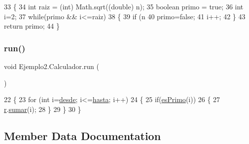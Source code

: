 \begin{DoxyCode}
33     \{
34         \textcolor{keywordtype}{int} raiz = (int) Math.sqrt((\textcolor{keywordtype}{double}) n);
35         \textcolor{keywordtype}{boolean} primo = \textcolor{keyword}{true};
36         \textcolor{keywordtype}{int} i=2;
37         \textcolor{keywordflow}{while}(primo && i<=raiz)
38         \{
39             \textcolor{keywordflow}{if} (n %
40                 primo=\textcolor{keyword}{false};
41             i++;
42         \}
43         \textcolor{keywordflow}{return} primo;
44     \}
\end{DoxyCode}
\mbox{\label{class_ejemplo2_1_1_calculador_a0b410188aefa5c53ddd250952ff2b8a9}} 
\subsubsection{\texorpdfstring{run()}{run()}}
{\footnotesize\ttfamily void Ejemplo2.\+Calculador.\+run (\begin{DoxyParamCaption}{ }\end{DoxyParamCaption})\hspace{0.3cm}{\ttfamily [inline]}}


\begin{DoxyCode}
22     \{
23         \textcolor{keywordflow}{for} (\textcolor{keywordtype}{int} i=\mbox{\hyperlink{class_ejemplo2_1_1_calculador_ae17892240dfa6e7eef00191f27759d95}{desde}}; i<=\mbox{\hyperlink{class_ejemplo2_1_1_calculador_a8d89146305d07fda007f0cb69038c62c}{hasta}}; i++)
24         \{
25             \textcolor{keywordflow}{if}(\mbox{\hyperlink{class_ejemplo2_1_1_calculador_aeef834dafd4eaa5ddebabe9b2db9b628}{esPrimo}}(i))
26             \{
27                 \mbox{\hyperlink{class_ejemplo2_1_1_calculador_abca6ebfaa258c5e7c77c30751f27fb64}{r}}.\mbox{\hyperlink{class_ejemplo2_1_1_resultado_a5380048af041ad186602af99251f40b8}{sumar}}(i);
28             \}
29         \}
30     \}
\end{DoxyCode}


\subsection{Member Data Documentation}
\mbox{\label{class_ejemplo2_1_1_calculador_ae17892240dfa6e7eef00191f27759d95}} 
